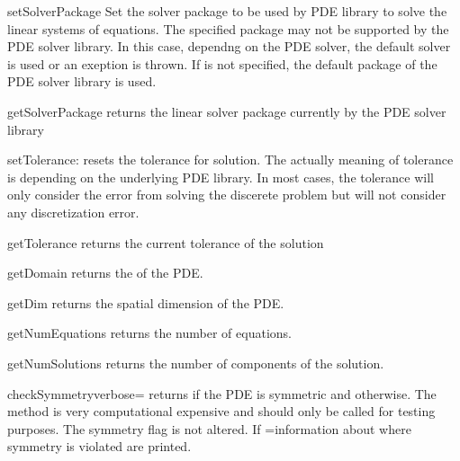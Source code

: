 \begin{methoddesc}[LinearPDE]{setSolverPackage}{}
Set the solver package to be used by PDE library to solve the linear systems of equations. The
specified package may not be supported by the PDE solver library. In this case, dependng on
the PDE solver, the default solver is used or an exeption is thrown.
If  is not specified, the default package of the PDE solver library is used.
\end{methoddesc}

\begin{methoddesc}[LinearPDE]{getSolverPackage}{}
returns the linear solver package currently by the PDE solver library
\end{methoddesc}


\begin{methoddesc}[LinearPDE]{setTolerance}{}:
resets the tolerance for solution. The actually meaning of tolerance is
depending on the underlying PDE library. In most cases, the tolerance
will only consider the error from solving the discerete problem but will
not consider any discretization error.
\end{methoddesc}

\begin{methoddesc}[LinearPDE]{getTolerance}{}
returns the current tolerance of the solution
\end{methoddesc}

\begin{methoddesc}[LinearPDE]{getDomain}{}
returns the \Domain of the PDE.
\end{methoddesc}

\begin{methoddesc}[LinearPDE]{getDim}{}
returns the spatial dimension of the PDE.
\end{methoddesc}

\begin{methoddesc}[LinearPDE]{getNumEquations}{}
returns the number of equations.
\end{methoddesc}

\begin{methoddesc}[LinearPDE]{getNumSolutions}{}
returns the number of components of the solution.
\end{methoddesc}

\begin{methoddesc}[LinearPDE]{checkSymmetry}{verbose=\False}
returns \True if the PDE is symmetric and \False otherwise.
The method is very computational expensive and should only be
called for testing purposes. The symmetry flag is not altered.
If =\True information about where symmetry is violated
are printed.
\end{methoddesc}

